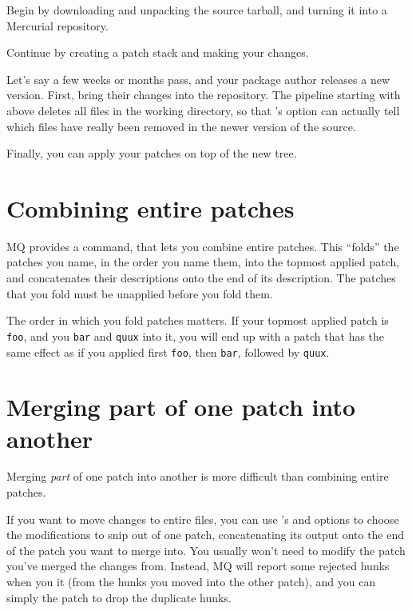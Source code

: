 Begin by downloading and unpacking the source tarball,
and turning it into a Mercurial repository.

Continue by creating a patch stack and making your changes.

Let's say a few weeks or months pass, and your package author releases
a new version.  First, bring their changes into the repository.
The pipeline starting with  above deletes all files in
the working directory, so that 's
 option can actually tell which files have
really been removed in the newer version of the source.

Finally, you can apply your patches on top of the new tree.

\section{Combining entire patches}
\label{sec:mq:combine}

MQ provides a command,  that lets you combine entire
patches.  This ``folds'' the patches you name, in the order you name
them, into the topmost applied patch, and concatenates their
descriptions onto the end of its description.  The patches that you
fold must be unapplied before you fold them.

The order in which you fold patches matters.  If your topmost applied
patch is \texttt{foo}, and you  \texttt{bar} and
\texttt{quux} into it, you will end up with a patch that has the same
effect as if you applied first \texttt{foo}, then \texttt{bar},
followed by \texttt{quux}.

\section{Merging part of one patch into another}

Merging \emph{part} of one patch into another is more difficult than
combining entire patches.

If you want to move changes to entire files, you can use
's  and
 options to choose the modifications to snip
out of one patch, concatenating its output onto the end of the patch
you want to merge into.  You usually won't need to modify the patch
you've merged the changes from.  Instead, MQ will report some rejected
hunks when you  it (from the hunks you moved into the
other patch), and you can simply  the patch to drop
the duplicate hunks.

